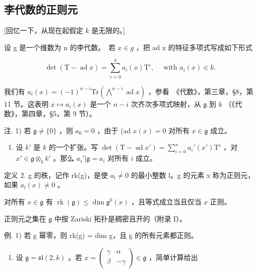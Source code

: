 \subsection{李代数的正则元}

{[}回忆一下，从现在起假定 \(k\) 是无限的。{]}

设 g 是一个维数为 n 的李代数。~若 \(x \in g\) ，把 ad x 的特征多项式写成如下形式

\[
\det (\mathrm{T} - \operatorname{ad} x) = \sum_ {i = 0} ^ {n} a _ {i} (x) \mathrm{T} ^ {i}, \quad \text { with } a _ {i} (x) \in k.
\]

我们有 \(a_i(x) = (-1)^{n - i}\mathrm{Tr}\left(\bigwedge^{n - i}\operatorname {ad}x\right)\) ，参看~《代数》，第三章，§8，第 11 节。这表明 \(x\mapsto a_i(x)\) 是一个 \(n - i\) 次齐次多项式映射，从 \(\mathfrak{g}\) 到 \(k\) （《代数》，第四章，§5，第 9 节）。

注. 1) 若 \(\mathfrak{g} \neq \{0\}\) ，则 \(a_0 = 0\) ，由于 (ad \(x(x) = 0\) 对所有 \(x \in \mathfrak{g}\) 成立。

\begin{enumerate}
\def\labelenumi{\arabic{enumi})}
\setcounter{enumi}{1}
\tightlist
\item
  设 \(k'\) 是 \(k\) 的一个扩张。写 \(\det(\mathrm{T} - \operatorname{ad} x') = \sum_{i=0}^{n} a_i'(x') \mathrm{T}^i\) ，对 \(x' \in \mathfrak{g} \otimes_k k'\) 。那么 \(a_i'| \mathfrak{g} = a_i\) 对所有 \(i\) 成立。
\end{enumerate}

定义 2. g 的秩，记作 rk(g)，是使 \(a_{l} \neq 0\) 的最小整数 l。g 的元素 x 称为正则元，如果 \(a_{l}(x) \neq 0\) 。

对所有 \(x \in \mathfrak{g}\) 有 \(\operatorname{rk}(\mathfrak{g}) \leq \dim \mathfrak{g}^0(x)\) ，且等式成立当且仅当 \(x\) 正则。

正则元之集在 \(\mathfrak{g}\) 中按 Zariski 拓扑是稠密且开的（附录 I）。

例. 1) 若 g 幂零，则 rk(g) = dim g，且 g 的所有元素都正则。

\begin{enumerate}
\def\labelenumi{\arabic{enumi})}
\setcounter{enumi}{1}
\tightlist
\item
  设 \(\mathfrak{g} = \mathfrak{sl}(2,k)\) 。若 \(x = \begin{pmatrix} \gamma & \alpha \\ \beta & -\gamma \end{pmatrix} \in \mathfrak{g}\) ，简单计算给出
\end{enumerate}

